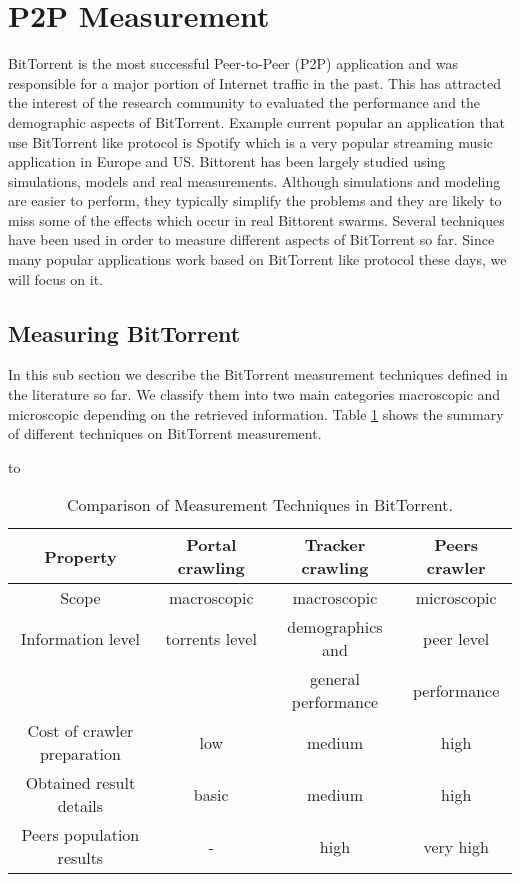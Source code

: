 \section{P2P Measurement}

BitTorrent is the most successful Peer-to-Peer (P2P) application and was responsible for a major portion of Internet traffic in the past.
This has attracted the interest of the research community to evaluated the performance and the demographic aspects of BitTorrent.
Example current popular an application that use BitTorrent like protocol is Spotify which is a very popular streaming music application in Europe and US.
Bittorent has been largely studied using simulations, models and real measurements. 
Although simulations and modeling are easier to perform, they typically simplify the problems and they are likely to miss some of the effects which occur in real Bittorent swarms. 
Several techniques have been used in order to measure different aspects of BitTorrent so far. 
Since many popular applications work based on BitTorrent like protocol these days, we will focus on it.

\subsection{Measuring BitTorrent}
In this sub section we describe the BitTorrent measurement techniques defined in the literature so far. 
We classify them into two main categories macroscopic and microscopic depending on the retrieved information. 
Table \ref{tab:measurementtechniques} shows the summary of different techniques on BitTorrent measurement. 

\begin{table}[thb]
\caption{Comparison of Measurement Techniques in BitTorrent.}
\label{tab:measurementtechniques}
\hbox to\hsize{\hfil}
\begin{tabular}{c|c|c|c}\hline\hline
Property & Portal crawling & Tracker crawling & Peers crawler \\ \hline
Scope & macroscopic & macroscopic & microscopic \\ \hline
Information level & torrents level & demographics and  & peer level \\
 &  & general performance  & performance \\ \hline
Cost of crawler preparation & low & medium & high \\ \hline
Obtained result details & basic & medium & high \\ \hline
Peers population results & - & high & very high \\ \hline
\end{tabular}
\end{table}


